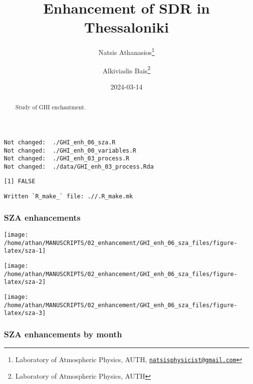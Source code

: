 \documentclass[
  10pt,
  a4paper,oneside]{article}
\title{Enhancement of SDR in Thessaloniki}
\author{Natsis Athanasios\footnote{Laboratory of Atmospheric Physics, AUTH, \href{mailto:natsisphysicist@gmail.com}{\nolinkurl{natsisphysicist@gmail.com}}} \and Alkiviadis Bais\footnote{Laboratory of Atmospheric Physics, AUTH}}
\date{2024-03-14}
\begin{document}
\maketitle
\begin{abstract}
Study of GHI enchantment.
\end{abstract}

{
\hypersetup{linkcolor=}
\setcounter{tocdepth}{4}
\tableofcontents
}
\begin{verbatim}
Not changed:  ./GHI_enh_06_sza.R 
Not changed:  ./GHI_enh_00_variables.R 
Not changed:  ./GHI_enh_03_process.R 
Not changed:  ./data/GHI_enh_03_process.Rda 
\end{verbatim}

\begin{verbatim}
[1] FALSE
\end{verbatim}

\begin{verbatim}
Written `R_make_` file: .//.R_make.mk 
\end{verbatim}

\newpage
\FloatBarrier

\hypertarget{sza-enhancements}{%
\subsubsection{SZA enhancements}\label{sza-enhancements}}

\begin{center}\texttt{[image: /home/athan/MANUSCRIPTS/02\_enhancement/GHI\_enh\_06\_sza\_files/figure-latex/sza-1]} \end{center}

\begin{center}\texttt{[image: /home/athan/MANUSCRIPTS/02\_enhancement/GHI\_enh\_06\_sza\_files/figure-latex/sza-2]} \end{center}

\begin{center}\texttt{[image: /home/athan/MANUSCRIPTS/02\_enhancement/GHI\_enh\_06\_sza\_files/figure-latex/sza-3]} \end{center}

\newpage
\FloatBarrier

\hypertarget{sza-enhancements-by-month}{%
\subsubsection{SZA enhancements by month}\label{sza-enhancements-by-month}}
\end{document}
